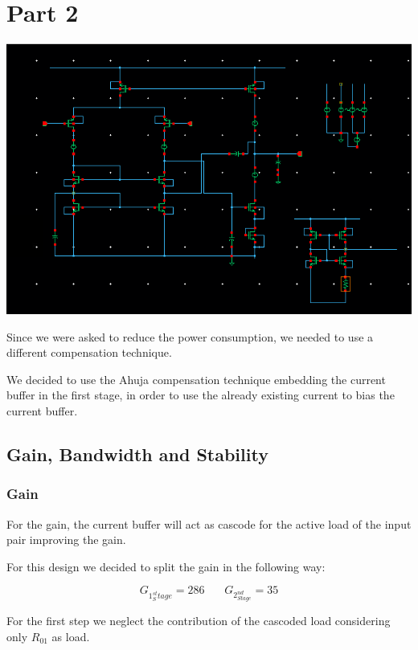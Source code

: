 \chapter{Part 2} %
\label{cha:part_2}


\centering
\includegraphics[width=1\textwidth]{Capitoli/whole2.png}
\raggedright



Since we were asked to reduce the power consumption, we needed to use a different compensation technique.

We decided to use the Ahuja compensation technique embedding the current buffer in the first stage, in order to use the already existing current to bias the current buffer.

\section{Gain, Bandwidth and Stability}

\subsection{Gain} %
\label{sec:gain}

For the gain, the current buffer will act as cascode for the active load of the input pair improving the gain.

For this design we decided to split the gain in the following way:

\begin{equation}
	G_{1^{st}_Stage}=286 \ \ \ \ \ \ \ \ 
	G_{2^{nd}_{Stage}}=35
\end{equation}


For the first step we neglect the contribution of the cascoded load considering only $R_{01}$ as load.

